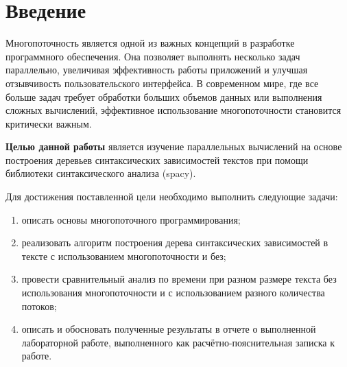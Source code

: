 \chapter*{Введение}

Многопоточность является одной из важных концепций в разработке программного обеспечения. Она позволяет выполнять несколько задач параллельно, увеличивая эффективность работы приложений и улучшая отзывчивость пользовательского интерфейса. В современном мире, где все больше задач требует обработки больших объемов данных или выполнения сложных вычислений, эффективное использование многопоточности становится критически важным.

\textbf{Целью данной работы} является изучение параллельных вычислений на основе построения деревьев синтаксических зависимостей текстов при помощи библиотеки синтаксического анализа (spacy).

Для достижения поставленной цели необходимо выполнить следующие задачи:
\begin{enumerate}[label=\arabic*)]
	\item описать основы многопоточного программирования;
    \item реализовать алгоритм построения дерева синтаксических зависимостей в тексте с использованием многопоточности и без;
    \item провести сравнительный анализ по времени при разном размере текста без использования многопоточности и с использованием разного количества потоков;
	\item описать и обосновать полученные результаты в отчете о выполненной лабораторной работе, выполненного как расчётно-пояснительная записка к работе.
\end{enumerate}
